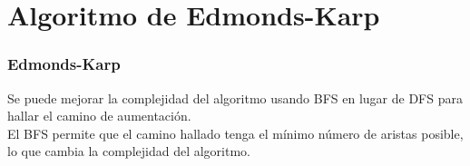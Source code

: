 \documentclass{beamer}
\begin{document}
\begin{frame}
\begin{columns}
\begin{figure}
				\end{figure}
		\end{columns}
	\end{frame}


\section[Edmonds-Karp]{Algoritmo de Edmonds-Karp}

	\begin{frame}
		\frametitle{Edmonds-Karp}
		Se puede mejorar la complejidad del algoritmo usando BFS en lugar de DFS para hallar el camino de aumentación.\\
		El BFS permite que el camino hallado tenga el mínimo número de aristas posible, lo que cambia la complejidad del algoritmo.
	\end{frame}
	
\end{document}
